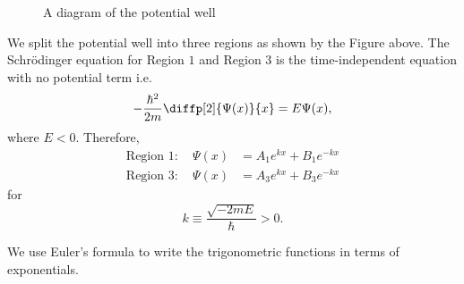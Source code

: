 \documentclass[12pt, a4paper]{article}
\begin{document}
\begin{figure}[H]
     \begin{center}
     \end{center}
     \caption{A diagram of the potential well}
\end{figure}

We split the potential well into three regions as shown by the Figure above. The Schrödinger equation for Region \(1\) and Region \(3\) is the time-independent equation with no potential term i.e.
\[-\frac{\hbar^2}{2m} \diffp[2]{\Psi(x)}{x} = E \Psi(x),\]
where \(E<0\). Therefore, 
\[\begin{aligned}
    \text{Region } 1: \quad \Psi(x) &= A_1e^{kx}+B_1e^{-kx} \\
    \text{Region } 3: \quad \Psi(x) &= A_3e^{kx}+B_3e^{-kx}
\end{aligned}\]
for 
\[k \equiv \frac{\sqrt{-2mE}}{\hbar}>0.\]

\begin{mdremark}
    We use Euler's formula to write the trigonometric functions in terms of exponentials.
\end{mdremark}
\end{document}
